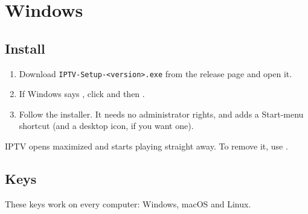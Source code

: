 
\section{Windows}
\label{sec:windows}

\subsection{Install}
\begin{enumerate}
  \item Download \texttt{IPTV-Setup-\textless version\textgreater.exe} from
        the release page and open it.
  \item If Windows says , click
         and then .
  \item Follow the installer. It needs no administrator rights, and adds a
        Start-menu shortcut (and a desktop icon, if you want one).
\end{enumerate}
IPTV opens maximized and starts playing straight away. To remove it, use
.

\subsection{Keys}
\label{sec:keys}
These keys work on every computer: Windows, macOS and Linux.

